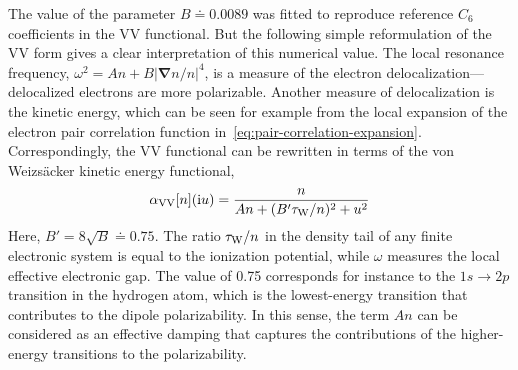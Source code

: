 The value of the parameter $B\doteq0.0089$ was fitted to reproduce reference $C_6$ coefficients in the VV functional.
But the following simple reformulation of the VV form gives a clear interpretation of this numerical value.
The local resonance frequency, $\omega^2=An+B|\boldsymbol\nabla n/n|^4$, is a measure of the electron delocalization---delocalized electrons are more polarizable.
Another measure of delocalization is the kinetic energy, which can be seen for example from the local expansion of the electron pair correlation function in~\eqref{eq:pair-correlation-expansion}.
Correspondingly, the VV functional can be rewritten in terms of the von Weizsäcker kinetic energy functional,
\begin{equation}
  \alpha_\text{VV}[n](\mathrm iu)=\frac{n}{An+(B'\tau_\text W/n)^2+u^2}
\end{equation}
Here, $B'=8\sqrt{B}\doteq0.75$.
The ratio $\tau_\text W/n$ in the density tail of any finite electronic system is equal to the ionization potential, while $\omega$ measures the local effective electronic gap.
The value of 0.75 corresponds for instance to the $1s\rightarrow2p$ transition in the hydrogen atom, which is the lowest-energy transition that contributes to the dipole polarizability.
In this sense, the term $An$ can be considered as an effective damping that captures the contributions of the higher-energy transitions to the polarizability.

